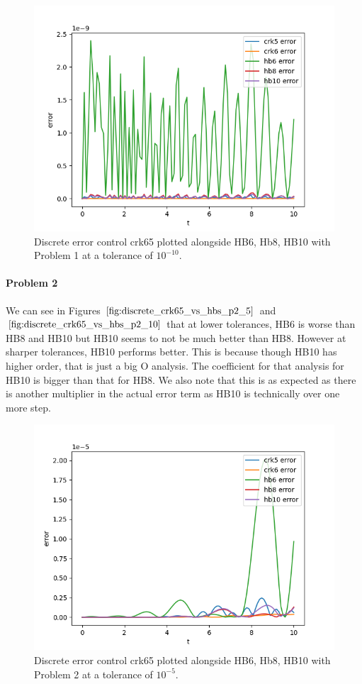 \begin{figure}[H]
\centering
\includegraphics[width=0.7\linewidth]{./figures/discrete_crk65_vs_hbs_p1_10}
\caption{Discrete error control crk65 plotted alongside HB6, Hb8, HB10 with Problem 1 at a tolerance of $10^{-10}$.}
\label{fig:discrete_crk65_vs_hbs_p1_10}
\end{figure}

\paragraph{Problem 2} We can see in Figures $\ref{fig:discrete_crk65_vs_hbs_p2_5}$ and $\ref{fig:discrete_crk65_vs_hbs_p2_10}$ that at lower tolerances, HB6 is worse than HB8 and HB10 but HB10 seems to not be much better than HB8. However at sharper tolerances, HB10 performs better. This is because though HB10 has higher order, that is just a big O analysis. The coefficient for that analysis for HB10 is bigger than that for HB8. We also note that this is as expected as there is another multiplier in the actual error term as HB10 is technically over one more step. 


\begin{figure}[H]
\centering
\includegraphics[width=0.7\linewidth]{./figures/discrete_crk65_vs_hbs_p2_5}
\caption{Discrete error control crk65 plotted alongside HB6, Hb8, HB10 with Problem 2 at a tolerance of $10^{-5}$.}
\label{fig:discrete_crk65_vs_hbs_p2_5}
\end{figure}

